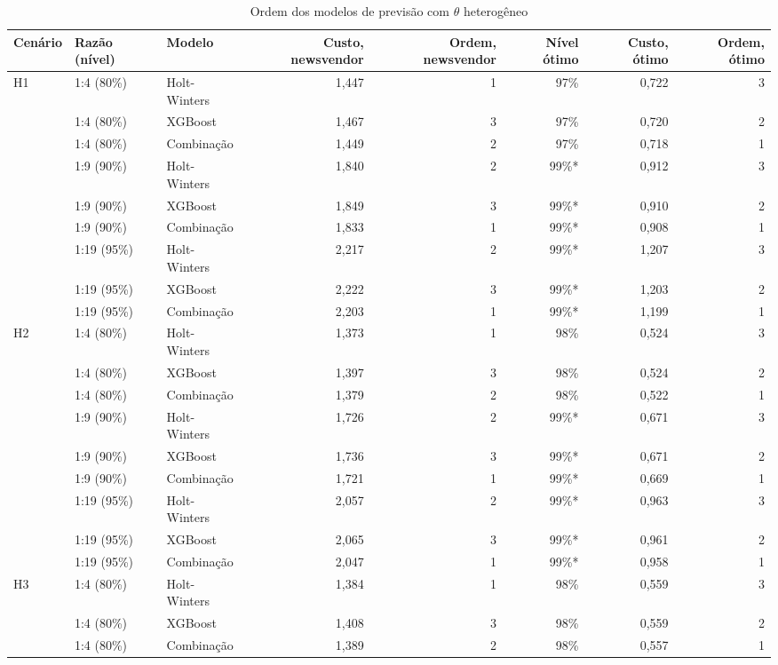 \begin{table}[htbp]
\centering
\small
\caption{Ordem dos modelos de previsão com $\theta$ heterogêneo}
\label{tab:het_ordem_modelos}
\begin{tabular}{lllrrrrr}
\toprule
Cenário & Razão (nível) & Modelo & Custo, newsvendor & Ordem, newsvendor & Nível ótimo & Custo, ótimo & Ordem, ótimo \\
\midrule
H1 & 1:4 (80\%) & Holt-Winters & 1,447 & 1 & 97\% & 0,722 & 3 \\
 & 1:4 (80\%) & XGBoost & 1,467 & 3 & 97\% & 0,720 & 2 \\
 & 1:4 (80\%) & Combinação & 1,449 & 2 & 97\% & 0,718 & 1 \\
 & 1:9 (90\%) & Holt-Winters & 1,840 & 2 & 99\%* & 0,912 & 3 \\
 & 1:9 (90\%) & XGBoost & 1,849 & 3 & 99\%* & 0,910 & 2 \\
 & 1:9 (90\%) & Combinação & 1,833 & 1 & 99\%* & 0,908 & 1 \\
 & 1:19 (95\%) & Holt-Winters & 2,217 & 2 & 99\%* & 1,207 & 3 \\
 & 1:19 (95\%) & XGBoost & 2,222 & 3 & 99\%* & 1,203 & 2 \\
 & 1:19 (95\%) & Combinação & 2,203 & 1 & 99\%* & 1,199 & 1 \\
\addlinespace
H2 & 1:4 (80\%) & Holt-Winters & 1,373 & 1 & 98\% & 0,524 & 3 \\
 & 1:4 (80\%) & XGBoost & 1,397 & 3 & 98\% & 0,524 & 2 \\
 & 1:4 (80\%) & Combinação & 1,379 & 2 & 98\% & 0,522 & 1 \\
 & 1:9 (90\%) & Holt-Winters & 1,726 & 2 & 99\%* & 0,671 & 3 \\
 & 1:9 (90\%) & XGBoost & 1,736 & 3 & 99\%* & 0,671 & 2 \\
 & 1:9 (90\%) & Combinação & 1,721 & 1 & 99\%* & 0,669 & 1 \\
 & 1:19 (95\%) & Holt-Winters & 2,057 & 2 & 99\%* & 0,963 & 3 \\
 & 1:19 (95\%) & XGBoost & 2,065 & 3 & 99\%* & 0,961 & 2 \\
 & 1:19 (95\%) & Combinação & 2,047 & 1 & 99\%* & 0,958 & 1 \\
\addlinespace
H3 & 1:4 (80\%) & Holt-Winters & 1,384 & 1 & 98\% & 0,559 & 3 \\
 & 1:4 (80\%) & XGBoost & 1,408 & 3 & 98\% & 0,559 & 2 \\
 & 1:4 (80\%) & Combinação & 1,389 & 2 & 98\% & 0,557 & 1 \\

\end{tabular}
\end{table}
